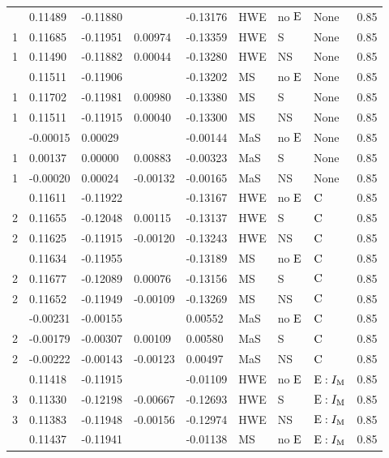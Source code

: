 \begin{longtable}[t]{lllllllll}
\endfoot
\bottomrule
\endlastfoot
1 & 0.11489 & -0.11880 &  & -0.13176 & HWE & no ${\rm E}$ & None & 0.85\\
1 & 0.11685 & -0.11951 & 0.00974 & -0.13359 & HWE & S & None & 0.85\\
1 & 0.11490 & -0.11882 & 0.00044 & -0.13280 & HWE & NS & None & 0.85\\
\addlinespace
1 & 0.11511 & -0.11906 &  & -0.13202 & MS & no ${\rm E}$ & None & 0.85\\
1 & 0.11702 & -0.11981 & 0.00980 & -0.13380 & MS & S & None & 0.85\\
1 & 0.11511 & -0.11915 & 0.00040 & -0.13300 & MS & NS & None & 0.85\\
\addlinespace
1 & -0.00015 & 0.00029 &  & -0.00144 & MaS & no ${\rm E}$ & None & 0.85\\
1 & 0.00137 & 0.00000 & 0.00883 & -0.00323 & MaS & S & None & 0.85\\
1 & -0.00020 & 0.00024 & -0.00132 & -0.00165 & MaS & NS & None & 0.85\\
\addlinespace
2 & 0.11611 & -0.11922 &  & -0.13167 & HWE & no ${\rm E}$ & ${\rm C}$ & 0.85\\
2 & 0.11655 & -0.12048 & 0.00115 & -0.13137 & HWE & S & ${\rm C}$ & 0.85\\
2 & 0.11625 & -0.11915 & -0.00120 & -0.13243 & HWE & NS & ${\rm C}$ & 0.85\\
\addlinespace
2 & 0.11634 & -0.11955 &  & -0.13189 & MS & no ${\rm E}$ & ${\rm C}$ & 0.85\\
2 & 0.11677 & -0.12089 & 0.00076 & -0.13156 & MS & S & ${\rm C}$ & 0.85\\
2 & 0.11652 & -0.11949 & -0.00109 & -0.13269 & MS & NS & ${\rm C}$ & 0.85\\
\addlinespace
2 & -0.00231 & -0.00155 &  & 0.00552 & MaS & no ${\rm E}$ & ${\rm C}$ & 0.85\\
2 & -0.00179 & -0.00307 & 0.00109 & 0.00580 & MaS & S & ${\rm C}$ & 0.85\\
2 & -0.00222 & -0.00143 & -0.00123 & 0.00497 & MaS & NS & ${\rm C}$ & 0.85\\
\addlinespace
3 & 0.11418 & -0.11915 &  & -0.01109 & HWE & no ${\rm E}$ & ${\rm E}:I_{{\rm M}}$ & 0.85\\
3 & 0.11330 & -0.12198 & -0.00667 & -0.12693 & HWE & S & ${\rm E}:I_{{\rm M}}$ & 0.85\\
3 & 0.11383 & -0.11948 & -0.00156 & -0.12974 & HWE & NS & ${\rm E}:I_{{\rm M}}$ & 0.85\\
\addlinespace
3 & 0.11437 & -0.11941 &  & -0.01138 & MS & no ${\rm E}$ & ${\rm E}:I_{{\rm M}}$ & 0.85\\

\end{longtable}
